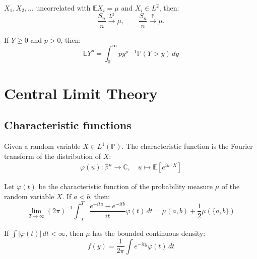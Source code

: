 \begin{theorem}
	$X_1, X_2, \dots$ uncorrelated with $\mathbb{E}X_i = \mu$ and $X_i \in L^2$, then:
	\begin{equation*}
		\frac{S_n}{n} \overset{L^2}{\longrightarrow}\mu, \qquad \frac{S_n}{n} \overset{\mathbb{P}}{\longrightarrow} \mu.
	\end{equation*}
\end{theorem}

\begin{lemma}
	If $Y\geq 0$ and $p >0$, then:
	\begin{equation*}
		\mathbb{E} Y^p = \int_{0}^\infty p y^{p-1} \mathbb{P}(Y > y) \, dy
	\end{equation*}
\end{lemma}



\section{Central Limit Theory}
\subsection{Characteristic functions}
\begin{definition}
	Given a random variable $X \in L^1(\mathbb{P})$. The characteristic function is the Fourier transform of the distribution of $X$:
	\begin{align*}
		\varphi(u): \mathbb{R}^n \rightarrow \mathbb{C}, \quad u \mapsto \mathbb{E}[e^{iu \cdot X}]
	\end{align*}
\end{definition}

\begin{example}
\end{example}



\begin{theorem}
	Let $\varphi(t)$ be the characteristic function of the probability measure $\mu$ of the random variable $X$. If $a<b$, then:
	\begin{equation*}
		\lim_{T \rightarrow \infty} (2\pi)^{-1} \int_{-T}^T \frac{e^{-ita} - e^{-itb}}{it} \varphi(t) \, dt = \mu(a, b) + \frac{1}{2} \mu(\{a, b\})
	\end{equation*}
\end{theorem}

\begin{theorem}
	If $\int |\varphi(t)| \, dt < \infty$, then $\mu$ has the bounded continuous density:
	\begin{equation*}
		f(y) = \frac{1}{2\pi} \int e^{-ity} \varphi(t) \, dt
	\end{equation*}
\end{theorem}

